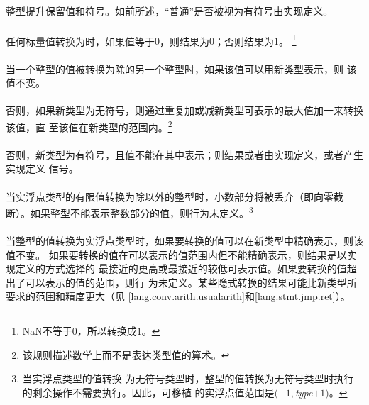 \paragraph{}
整型提升保留值和符号。如前所述，``普通''是否被视为有符号由实现定义。


\paragraph{}
任何标量值转换为时，如果值等于$0$，则结果为$0$；否则结果为$1$。
\footnote{NaN不等于$0$，所以转换成$1$。}

\paragraph{}
当一个整型的值被转换为除的另一个整型时，如果该值可以用新类型表示，则
该值不变。

\paragraph{}
否则，如果新类型为无符号，则通过重复加或减新类型可表示的最大值加一来转换该值，直
至该值在新类型的范围内。\footnote{该规则描述数学上而不是表达类型值的算术。}

\paragraph{}
否则，新类型为有符号，且值不能在其中表示；则结果或者由实现定义，或者产生实现定义
信号。

\paragraph{}
当实浮点类型的有限值转换为除以外的整型时，小数部分将被丢弃（即向零截
断）。如果整型不能表示整数部分的值，则行为未定义。\footnote{当实浮点类型的值转换
为无符号类型时，整型的值转换为无符号类型时执行的剩余操作不需要执行。因此，可移植
的实浮点值范围是$(-1,$\textit{type}$+1)$。}

\paragraph{}
当整型的值转换为实浮点类型时，如果要转换的值可以在新类型中精确表示，则该值不变。
如果要转换的值在可以表示的值范围内但不能精确表示，则结果是以实现定义的方式选择的
最接近的更高或最接近的较低可表示值。如果要转换的值超出了可以表示的值的范围，则行
为未定义。某些隐式转换的结果可能比新类型所要求的范围和精度更大（见
\ref{lang.conv.arith.usualarith}和\ref{lang.stmt.jmp.ret}）。

